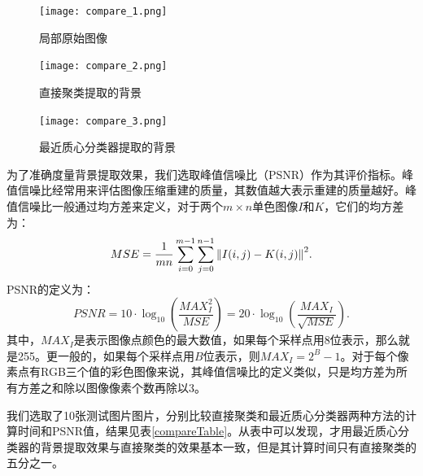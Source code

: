 \documentclass[UTF8,a4paper,twoside]{ctexart}
\begin{document}
\begin{figure}[H]
  \centering
  \begin{minipage}{5cm}
    \centering
    \texttt{[image: compare\_1.png]}
    \caption{局部原始图像}
    \label{compare_1}
  \end{minipage}
  \hspace{0.2cm}%
  \begin{minipage}{5cm}
    \centering
    \texttt{[image: compare\_2.png]}
    \caption{直接聚类提取的背景}
    \label{compare_2}
  \end{minipage}
  \hspace{0.2cm}%
  \begin{minipage}{5cm}
    \centering
    \texttt{[image: compare\_3.png]}
    \caption{最近质心分类器提取的背景}
    \label{compare_3}
  \end{minipage}
\end{figure}

为了准确度量背景提取效果，我们选取峰值信噪比（PSNR）作为其评价指标。峰值信噪比经常用来评估图像压缩重建的质量，其数值越大表示重建的质量越好。峰值信噪比一般通过均方差来定义，对于两个$m\times n$单色图像$I$和$K$，它们的均方差为：
\begin{equation}
  MSE = \frac{1}{mn} \sum_{i=0}^{m-1} \sum_{j=0}^{n-1} \norm{I(i,j) - K(i,j)}^2.
\end{equation}
PSNR的定义为：
\begin{equation}
  PSNR = 10 \cdot \log_{10} \left(\frac{MAX_I^2}{MSE}\right) = 20 \cdot \log_{10}\left(\frac{MAX_I}{\sqrt{MSE}}\right).
\end{equation}
其中，$MAX_I$是表示图像点颜色的最大数值，如果每个采样点用8位表示，那么就是255。更一般的，如果每个采样点用$B$位表示，则$MAX_I = 2^B - 1$。对于每个像素点有RGB三个值的彩色图像来说，其峰值信噪比的定义类似，只是均方差为所有方差之和除以图像像素个数再除以3。

我们选取了10张测试图片图片，分别比较直接聚类和最近质心分类器两种方法的计算时间和PSNR值，结果见表\ref{compareTable}。从表中可以发现，才用最近质心分类器的背景提取效果与直接聚类的效果基本一致，但是其计算时间只有直接聚类的五分之一。
\end{document}
